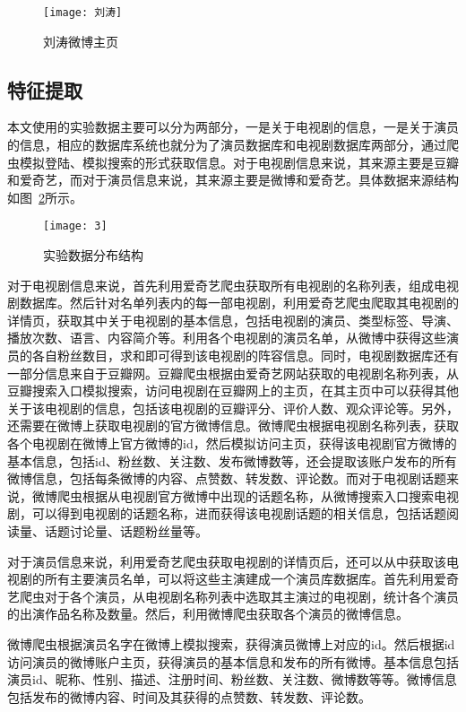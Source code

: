 \begin{figure}[h] 
  \centering
  \texttt{[image: 刘涛]}
  \caption{刘涛微博主页}
  \label{刘涛}
\end{figure}

\subsection{特征提取}

本文使用的实验数据主要可以分为两部分，一是关于电视剧的信息，一是关于演员的信息，相应的数据库系统也就分为了演员数据库和电视剧数据库两部分，通过爬虫模拟登陆、模拟搜索的形式获取信息。对于电视剧信息来说，其来源主要是豆瓣和爱奇艺，而对于演员信息来说，其来源主要是微博和爱奇艺。具体数据来源结构如图~\ref{3}所示。

\begin{figure}[!htbp]
\centering
\texttt{[image: 3]}
\caption{实验数据分布结构}
\label{3}
\end{figure}

对于电视剧信息来说，首先利用爱奇艺爬虫获取所有电视剧的名称列表，组成电视剧数据库。然后针对名单列表内的每一部电视剧，利用爱奇艺爬虫爬取其电视剧的详情页，获取其中关于电视剧的基本信息，包括电视剧的演员、类型标签、导演、播放次数、语言、内容简介等。利用各个电视剧的演员名单，从微博中获得这些演员的各自粉丝数目，求和即可得到该电视剧的阵容信息。同时，电视剧数据库还有一部分信息来自于豆瓣网。豆瓣爬虫根据由爱奇艺网站获取的电视剧名称列表，从豆瓣搜索入口模拟搜索，访问电视剧在豆瓣网上的主页，在其主页中可以获得其他关于该电视剧的信息，包括该电视剧的豆瓣评分、评价人数、观众评论等。另外，还需要在微博上获取电视剧的官方微博信息。微博爬虫根据电视剧名称列表，获取各个电视剧在微博上官方微博的id，然后模拟访问主页，获得该电视剧官方微博的基本信息，包括id、粉丝数、关注数、发布微博数等，还会提取该账户发布的所有微博信息，包括每条微博的内容、点赞数、转发数、评论数。而对于电视剧话题来说，微博爬虫根据从电视剧官方微博中出现的话题名称，从微博搜索入口搜索电视剧，可以得到电视剧的话题名称，进而获得该电视剧话题的相关信息，包括话题阅读量、话题讨论量、话题粉丝量等。

对于演员信息来说，利用爱奇艺爬虫获取电视剧的详情页后，还可以从中获取该电视剧的所有主要演员名单，可以将这些主演建成一个演员库数据库。首先利用爱奇艺爬虫对于各个演员，从电视剧名称列表中选取其主演过的电视剧，统计各个演员的出演作品名称及数量。然后，利用微博爬虫获取各个演员的微博信息。

微博爬虫根据演员名字在微博上模拟搜索，获得演员微博上对应的id。然后根据id访问演员的微博账户主页，获得演员的基本信息和发布的所有微博。基本信息包括演员id、昵称、性别、描述、注册时间、粉丝数、关注数、微博数等等。微博信息包括发布的微博内容、时间及其获得的点赞数、转发数、评论数。

